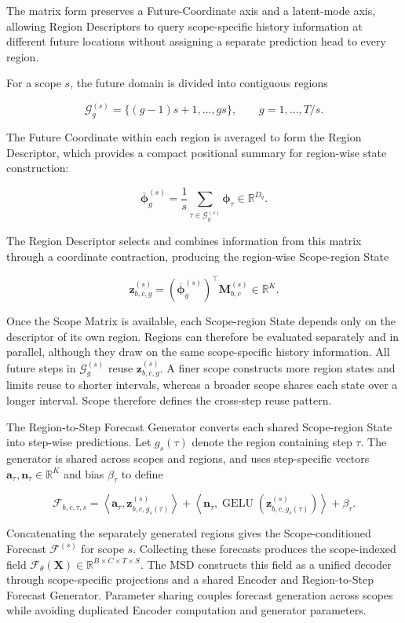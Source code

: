 \documentclass[final,3p,times]{elsarticle}
\newif\ifshowrevisions
\newcommand{\rev}[1]{\ifshowrevisions\textcolor{revisionblue}{#1}\else#1\fi}
\begin{document}
The matrix form preserves a Future-Coordinate axis and a latent-mode axis, allowing Region Descriptors to query scope-specific history information at different future locations without assigning a separate prediction head to every region.

For a scope $s$, the future domain is divided into contiguous regions

\[
\mathcal G_g^{(s)}
=
\{(g-1)s+1,\ldots,gs\},
\qquad
g=1,\ldots,T/s.
\]


The Future Coordinate within each region is averaged to form the Region Descriptor, which provides a compact positional summary for region-wise state construction:

\[
\overline{\boldsymbol\phi}_g^{(s)}
=
\frac{1}{s}
\sum_{\tau\in\mathcal G_g^{(s)}}
\boldsymbol\phi_\tau
\in\mathbb R^{D_q}.
\]


The Region Descriptor selects and combines information from this matrix through a coordinate contraction, producing the region-wise Scope-region State

\[
\mathbf z_{b,c,g}^{(s)}
=
\left(\overline{\boldsymbol\phi}_g^{(s)}\right)^\top
\mathbf M_{b,c}^{(s)}
\in\mathbb R^K.
\]


Once the Scope Matrix is available, each Scope-region State depends only on the descriptor of its own region. Regions can therefore be evaluated separately and in parallel, although they draw on the same scope-specific history information. All future steps in $\mathcal G_g^{(s)}$ reuse $\mathbf z_{b,c,g}^{(s)}$. A finer scope constructs more region states and limits reuse to shorter intervals, whereas a broader scope shares each state over a longer interval. Scope therefore defines the cross-step reuse pattern.

The Region-to-Step Forecast Generator converts each shared Scope-region State into step-wise predictions. Let $g_s(\tau)$ denote the region containing step $\tau$. The generator is shared across scopes and regions, and uses step-specific vectors $\mathbf a_\tau,\mathbf n_\tau\in\mathbb R^K$ and bias $\beta_\tau$ to define

\[
\mathcal F_{b,c,\tau,s}
=
\left\langle
\mathbf a_\tau,
\mathbf z_{b,c,g_s(\tau)}^{(s)}
\right\rangle
+
\left\langle
\mathbf n_\tau,
\operatorname{GELU}\!\left(
\mathbf z_{b,c,g_s(\tau)}^{(s)}
\right)
\right\rangle
+
\beta_\tau.
\]


Concatenating the separately generated regions gives the Scope-conditioned Forecast $\mathcal F^{(s)}$ for scope $s$. Collecting these forecasts produces the scope-indexed field $\mathcal F_\theta(\mathbf X)\in\mathbb R^{B\times C\times T\times S}$. \rev{The MSD constructs this field as a unified decoder through scope-specific projections and a shared Encoder and Region-to-Step Forecast Generator. Parameter sharing couples forecast generation across scopes while avoiding duplicated Encoder computation and generator parameters.}
\end{document}
